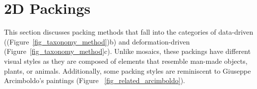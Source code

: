 

\section{2D Packings}

\nnewtext
{
This section discusses packing methods that fall into the categories of data-driven ((Figure~\ref{fig_taxonomy_method})b) and 
deformation-driven (Figure~\ref{fig_taxonomy_method}c).
Unlike mosaics, these packings have different visual styles as they are composed of 
elements that resemble man-made objects, plants, or animals.
Additionally, some packing styles are reminiscent to Giuseppe Arcimboldo's paintings 
(Figure ~\ref{fig_related_arcimboldo}).}

